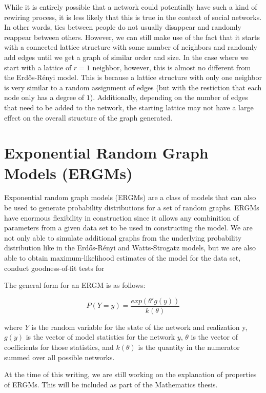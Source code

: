 \documentclass[12pt,twoside]{amherstthesis}
\begin{document}
  While it is entirely possible that a network could potentially have such
  a kind of rewiring process, it is less likely that this is true in the
  context of social networks. In other words, ties between people do not
  usually disappear and randomly reappear between others. However, we can
  still make use of the fact that it starts with a connected lattice
  structure with some number of neighbors and randomly add edges until we
  get a graph of similar order and size. In the case where we start with a
  lattice of \(r = 1\) neighbor, however, this is almost no different from
  the Erdős-Rényi model. This is because a lattice structure with only one
  neighbor is very similar to a random assignment of edges (but with the
  restiction that each node only has a degree of \(1\)). Additionally,
  depending on the number of edges that need to be added to the network,
  the starting lattice may not have a large effect on the overall
  structure of the graph generated.
  
  \section{Exponential Random Graph Models
  (ERGMs)}\label{exponential-random-graph-models-ergms}
  
  Exponential random graph models (ERGMs) are a class of models that can
  also be used to generate probability distributions for a set of random
  graphs. ERGMs have enormous flexibility in construction since it allows
  any combinition of parameters from a given data set to be used in
  constructing the model. We are not only able to simulate additional
  graphs from the underlying probability distribution like in the
  Erdős-Rényi and Watts-Strogatz models, but we are also able to obtain
  maximum-likelihood estimates of the model for the data set, conduct
  goodness-of-fit tests for
  
  The general form for an ERGM is as follows:
  
  \[P(Y = y) = \frac {exp(\theta'g(y))} {k(\theta)}\]
  
  where \(Y\) is the random variable for the state of the network and
  realization y, \(g(y)\) is the vector of model statistics for the
  network \(y\), \(\theta\) is the vector of coefficients for those
  statistics, and \(k(\theta)\) is the quantity in the numerator summed
  over all possible networks.
  
  At the time of this writing, we are still working on the explanation of
  properties of ERGMs. This will be included as part of the Mathematics
  thesis.
  
\end{document}
